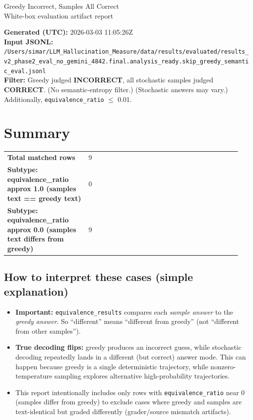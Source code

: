 \documentclass[11pt]{article}
\newcommand{\gradebad}[1]{\textcolor{red!70!black}{\textbf{#1}}}
\newcommand{\gradegood}[1]{\textcolor{green!50!black}{\textbf{#1}}}
\newcommand{\mono}[1]{\texttt{#1}}
\begin{document}
\begin{center}
{\LARGE Greedy Incorrect, Samples All Correct}\\[4pt]
{\large White-box evaluation artifact report}\\[6pt]
\end{center}
\textbf{Generated (UTC):} 2026-03-03 11:05:26Z\\
\textbf{Input JSONL:} \nolinkurl{/Users/simar/LLM_Hallucination_Measure/data/results/evaluated/results_v2_phase2_eval_no_gemini_4842.final.analysis_ready.skip_greedy_semantic_eval.jsonl}\\
\textbf{Filter:} Greedy judged \gradebad{INCORRECT}, all stochastic samples judged \gradegood{CORRECT}. (No semantic-entropy filter.) (Stochastic answers may vary.) Additionally, \mono{equivalence\_ratio} $\le$ 0.01.
\section*{Summary}
\begin{tabular}{@{}p{0.33\linewidth}p{0.62\linewidth}@{}}
\textbf{Total matched rows} & 9 \\
\textbf{Subtype: equivalence\_ratio approx 1.0 (samples text == greedy text)} & 0 \\
\textbf{Subtype: equivalence\_ratio approx 0.0 (samples text differs from greedy)} & 9 \\
\end{tabular}
\subsection*{How to interpret these cases (simple explanation)}
\begin{itemize}
\item \textbf{Important:} \mono{equivalence\_results} compares each \emph{sample answer} to the \emph{greedy answer}. So ``different'' means ``different from greedy'' (not ``different from other samples'').
\item \textbf{True decoding flips:} greedy produces an incorrect guess, while stochastic decoding repeatedly lands in a different (but correct) answer mode. This can happen because greedy is a single deterministic trajectory, while nonzero-temperature sampling explores alternative high-probability trajectories.
\item This report intentionally includes only rows with \mono{equivalence\_ratio} near 0 (samples differ from greedy) to exclude cases where greedy and samples are text-identical but graded differently (grader/source mismatch artifacts).
\end{itemize}
\end{document}
